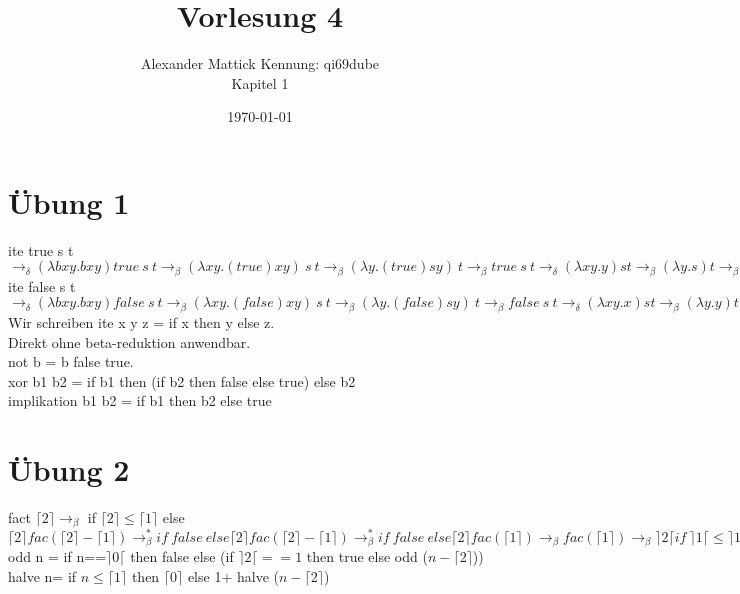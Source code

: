 \documentclass{article}
\author{
Alexander Mattick Kennung: qi69dube\\
Kapitel 1
}
\date{\today}
\title{Vorlesung 4}
\newcommand{\church}[1]{\lceil#1\rceil}
\begin{document}
	\maketitle
	\section{Übung 1}
	ite true s t $\to_\delta (\lambda bxy.bxy)true\ s\ t\to_\beta (\lambda xy.(true)xy)\ s\ t \to_\beta (\lambda y.(true)sy)\  t\to_\beta true\ s \ t\to_\delta (\lambda xy.y)st\to_\beta (\lambda y.s)t \to_\beta s$\\
	ite false s t $\to_\delta (\lambda bxy.bxy)false\ s\ t\to_\beta (\lambda xy.(false)xy)\ s\ t \to_\beta (\lambda y.(false)sy)\  t\to_\beta false\ s \ t\to_\delta (\lambda xy.x)st\to_\beta (\lambda y.y)t \to_\beta t$\\
	Wir schreiben ite x y z = if x then y else z.\\
	Direkt ohne beta-reduktion anwendbar.\\
	not b = b false true.\\
	xor b1 b2 = if b1 then (if b2 then false else true) else  b2\\
	implikation b1 b2 = if b1 then b2 else true\\
	\section{Übung 2}
	fact $\lceil 2\rceil\to_\beta$ if  $\lceil 2\rceil\leq \lceil 1\rceil$ else $\lceil 2\rceil fac(\lceil 2\rceil-\lceil 1\rceil)\to^*_\beta if\  false\ else \lceil 2\rceil fac(\lceil 2\rceil-\lceil 1\rceil)\to^*_\beta if\  false\ else \lceil 2\rceil fac(\lceil 1\rceil)\to_\beta  fac(\lceil 1\rceil)\to_\beta \rceil 2\lceil if\  \rceil 1\lceil\leq \rceil 1\lceil\ else \lceil 2\rceil fac(\lceil 1\rceil-\lceil 1\rceil)\to^*_\beta fac(\lceil 1\rceil)\to_\beta \rceil 2\lceil if\  true\ else \lceil 2\rceil fac(\lceil 1\rceil-\lceil 1\rceil)\to_\beta \rceil 2\lceil * \rceil 1\lceil = \rceil 2\lceil$ \\
	odd n = if n==$\rceil 0\lceil$ then false else (if $\rceil 2\lceil == 1$ then true else odd ($n-\church{2}$))\\
	halve n= if $n\leq\church{1}$ then $\church{0}$ else 1+ halve ($n-\church{2}$)\\
\end{document}
